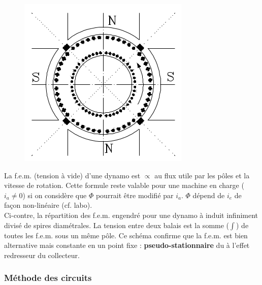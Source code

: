 		\newpage
		\begin{figure}
		\includegraphics[scale=0.4]{ch4/image6.png}
		\end{figure}
		La f.e.m. (tension à vide) d'une dynamo est $\propto$ au flux 
		utile par les pôles et la vitesse de rotation. Cette formule 
		reste valable pour une machine en charge ($i_a\neq0$) si on 
		considère que $\Phi$ pourrait être modifié par $i_a$. $\Phi$ 
		dépend de $i_e$ de façon non-linéaire (cf. labo).\\
		
		Ci-contre, la répartition des f.e.m. engendré pour une dynamo 
		à induit infiniment divisé de spires diamétrales. La tension 
		entre deux balais est la somme ($\int$) de toutes les f.e.m. 
		sous un même pôle. Ce schéma confirme que la f.e.m. est bien 
		alternative mais constante en un point fixe : 
		\textbf{pseudo-stationnaire} du à l'effet redresseur du 
		collecteur.

		\subsubsection{Méthode des circuits}
		
		
		
		
		
		
		
		
		
		
		
		
		
		
		
		
		
		
		
		
		
		
		
		
		
		
		
		
		
		